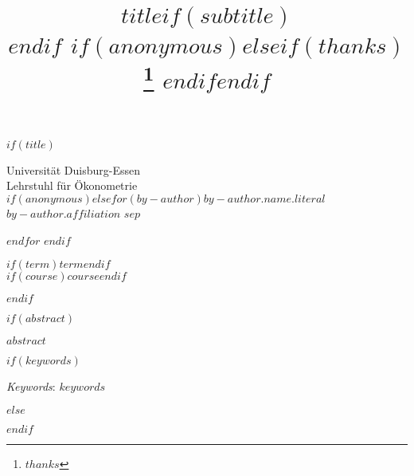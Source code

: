 \documentclass[$if(fontsize)$$fontsize$,$endif$$if(babel-lang)$$babel-lang$,$endif$$if(papersize)$$papersize$,$endif$$for(classoption)$$classoption$$sep$,$endfor$]{article}
\title{\center $title$$if(subtitle)$ \\[1em]\smaller{$subtitle$}$endif$ $if(anonymous)$$else$$if(thanks)$\thanks{$thanks$} $endif$$endif$ }
\date{}
\renewenvironment{abstract}
 {{%
    \setlength{\leftmargin}{0mm}
    \setlength{\rightmargin}{\leftmargin}%
  }%
  \relax}
 {\endlist}
\begin{document}

$if(title)$

{%

{

\vskip 40pt\relax \normalsize\fontsize{11}{12}

\begin{minipage}[t]{.49\textwidth}
Universität Duisburg-Essen\\
Lehrstuhl für Ökonometrie\\
$if(anonymous)$\hfill $else$$for(by-author)$$by-author.name.literal$ \hskip 15pt \emph{\small $by-author.affiliation$}  $sep$ \par $endfor$ $endif$
\end{minipage}%
%
\hfill
%
\begin{minipage}[t]{.49\textwidth}
  \begin{flushright}
    $if(term)$$term$$endif$\\
    $if(course)$$course$$endif$\\
  \end{flushright}
\end{minipage}

\vspace{20pt}

}

\setlength{\parindent}{0pt}
\thispagestyle{plain}
{\fontsize{10}{10}\selectfont\raggedright 
{\let\newpage\relax\maketitle}

}


}

\vskip 8.5pt

$endif$



$if(abstract)$

\begin{abstract}
    

    \hbox{\vrule height .2pt width 39.14pc}

    \vskip 8.5pt %

\noindent $abstract$

$if(keywords)$

\vskip 8.5pt \noindent \emph{Keywords}: $keywords$ \par

    \hbox{\vrule height .2pt width 39.14pc}


$else$

    \hbox{\vrule height .2pt width 39.14pc}

$endif$

\end{abstract}
\end{document}
